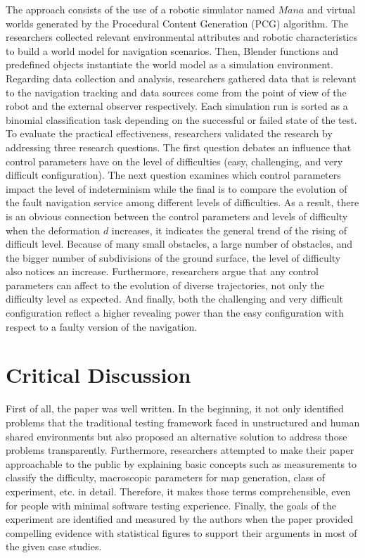 \documentclass[10pt,a4paper]{report}
\begin{document}
The approach consists of the use of a robotic simulator named $Mana$ and virtual worlds generated by the Procedural Content Generation (PCG) algorithm. 
%
The researchers collected relevant environmental attributes and robotic characteristics to build a world model for navigation scenarios.
%
Then, Blender functions and predefined objects instantiate the world model as a simulation environment.
%
Regarding data collection and analysis, researchers gathered data that is relevant to the navigation tracking and data sources come from the point of view of the robot and the external observer respectively.
%
Each simulation run is sorted as a binomial classification task depending on the successful or failed state of the test.
%
To evaluate the practical effectiveness, researchers validated the research by addressing three research questions.
%
The first question debates an influence that control parameters have on the level of difficulties (easy, challenging, and very difficult configuration).
%
The next question examines which control parameters impact the level of indeterminism while the final is to compare the evolution of the fault navigation service among different levels of difficulties.
%
As a result, there is an obvious connection between the control parameters and levels of difficulty when the deformation $d$ increases, it indicates the general trend of the rising of difficult level.
%
Because of many small obstacles, a large number of obstacles, and the bigger number of subdivisions of the ground surface, the level of difficulty also notices an increase.
%
Furthermore, researchers argue that any control parameters can affect to the evolution of diverse trajectories, not only the difficulty level as expected.
%
And finally, both the challenging and very difficult configuration reflect a higher revealing power than the easy configuration with respect to a faulty version of the navigation.



\section{Critical Discussion}
First of all, the paper was well written. In the beginning, it not only identified problems that the traditional testing framework faced in unstructured and human shared environments but also proposed an alternative solution to address those problems transparently.
%
Furthermore, researchers attempted to make their paper approachable to the public by explaining basic concepts such as measurements to classify the difficulty, macroscopic parameters for map generation, class of experiment, etc. in detail. Therefore, it makes those terms comprehensible, even for people with minimal software testing experience.  
%
Finally, the goals of the experiment are identified and measured by the authors when the paper provided compelling evidence with statistical figures to support their arguments in most of the given case studies.
%
\end{document}

